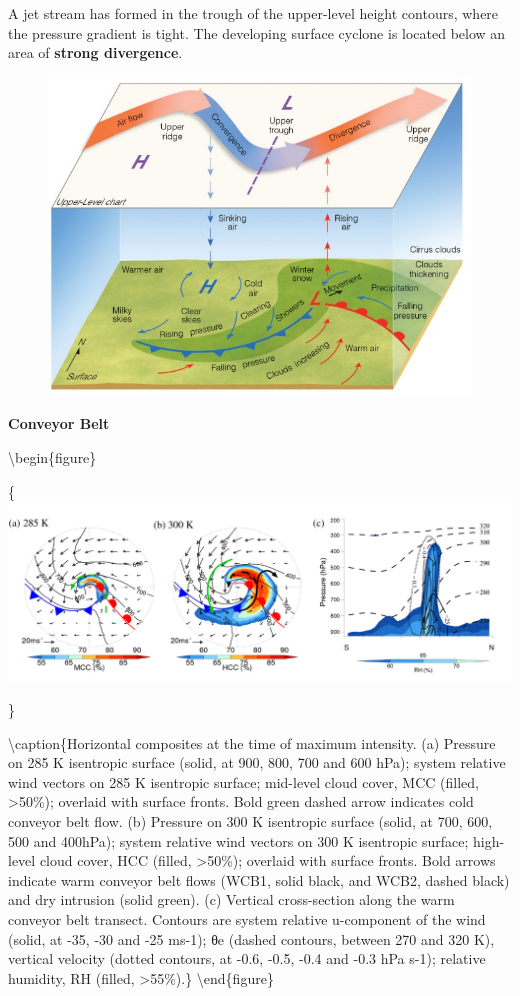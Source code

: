 \documentclass[12pt,oneside]{book}
\begin{document}
A jet stream has formed in the trough of the upper-level height
contours, where the pressure gradient is tight. The developing surface
cyclone is located below an area of \textbf{strong divergence}.

\begin{figure}

{\centering \includegraphics[width=0.8\linewidth]{figures/Figure633c} 

}

\caption{ }\label{fig:Fig633c}
\end{figure}

\textbf{Conveyor Belt}

\textbackslash{}begin\{figure\}

\{\centering \includegraphics[width=0.8\linewidth]{figures/Figure633d}

\}

\textbackslash{}caption\{Horizontal composites at the time of maximum
intensity. (a) Pressure on 285 K isentropic surface (solid, at 900, 800,
700 and 600 hPa); system relative wind vectors on 285 K isentropic
surface; mid-level cloud cover, MCC (filled, \textgreater{}50\%);
overlaid with surface fronts. Bold green dashed arrow indicates cold
conveyor belt flow. (b) Pressure on 300 K isentropic surface (solid, at
700, 600, 500 and 400hPa); system relative wind vectors on 300 K
isentropic surface; high-level cloud cover, HCC (filled,
\textgreater{}50\%); overlaid with surface fronts. Bold arrows indicate
warm conveyor belt flows (WCB1, solid black, and WCB2, dashed black) and
dry intrusion (solid green). (c) Vertical cross-section along the warm
conveyor belt transect. Contours are system relative u-component of the
wind (solid, at -35, -30 and -25 ms-1); θe (dashed contours, between 270
and 320 K), vertical velocity (dotted contours, at -0.6, -0.5, -0.4 and
-0.3 hPa s-1); relative humidity, RH (filled,
\textgreater{}55\%).\}\label{fig:Fig633d} \textbackslash{}end\{figure\}
\end{document}
